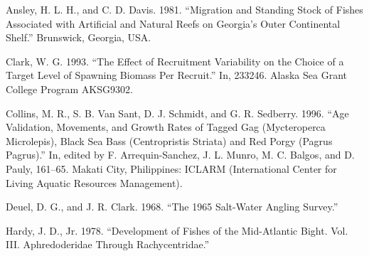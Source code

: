 \documentclass[
  letterpaper,
  oneside,
  open=any]{scrbook}
\newlength{\cslhangindent}
\newlength{\cslentryspacingunit} %
\newenvironment{CSLReferences}[2] %
 {%
  \setlength{\parindent}{0pt}
  \ifodd #1
  \let\oldpar\par
  \def\par{\hangindent=\cslhangindent\oldpar}
  \fi
  \setlength{\parskip}{#2\cslentryspacingunit}
 }%
 {}
\begin{document}

\hypertarget{refs}{}
\begin{CSLReferences}{1}{0}
\leavevmode{}%
Ansley, H. L. H., and C. D. Davis. 1981. {``Migration and Standing Stock
of Fishes Associated with Artificial and Natural Reefs on Georgia{'}s
Outer Continental Shelf.''} Brunswick, Georgia, USA.

\leavevmode{}%
Clark, W. G. 1993. {``The Effect of Recruitment Variability on the
Choice of a Target Level of Spawning Biomass Per Recruit.''} In, 233246.
Alaska Sea Grant College Program
AK{\textendash}SG{\textendash}93{\textendash}02.

\leavevmode{}%
Collins, M. R., S. B. Van Sant, D. J. Schmidt, and G. R. Sedberry. 1996.
{``Age Validation, Movements, and Growth Rates of Tagged Gag
(Mycteroperca Microlepis), Black Sea Bass (Centropristis Striata) and
Red Porgy (Pagrus Pagrus).''} In, edited by F. Arrequin-Sanchez, J. L.
Munro, M. C. Balgos, and D. Pauly, 161--65. Makati City, Philippines:
ICLARM (International Center for Living Aquatic Resources Management).

\leavevmode{}%
Deuel, D. G., and J. R. Clark. 1968. {``The 1965 Salt-Water Angling
Survey.''}

\leavevmode{}%
Hardy, J. D., Jr. 1978. {``Development of Fishes of the Mid-Atlantic
Bight. Vol. III. Aphredoderidae Through Rachycentridae.''}

\end{CSLReferences}


\backmatter
\end{document}
